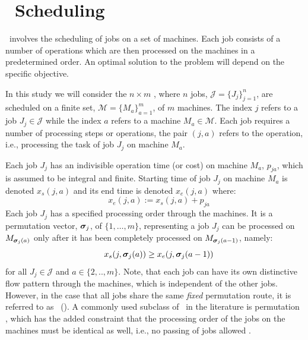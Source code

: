 \documentclass[twocolumn]{svjour3}
\begin{document}

\section{\Jsp~Scheduling}\label{sec:problemdef}
\JSP\ involves the scheduling of jobs on a set of 
machines. Each job consists of a number of operations which are then processed 
on the machines in a predetermined order. An optimal solution to the problem 
will depend on the specific objective. 

In this study we will consider the $n\times m$ \JSP, where $n$ jobs, 
$\mathcal{J}=\{J_j\}_{j=1}^n$, are scheduled on a finite set, 
$\mathcal{M}=\{M_a\}_{a=1}^m$, of $m$ machines. The index $j$ refers to a job 
$J_j\in\mathcal{J}$ while the index  $a$ refers to a machine 
$M_a\in\mathcal{M}$. 
Each job requires a number of processing steps or operations, the pair 
$(j,a)$ refers to the operation, i.e., processing the task of job $J_j$ on 
machine $M_a$. 

Each job $J_j$ has an indivisible operation time (or cost) on machine $M_a$, 
$p_{ja}$, which is assumed to be integral and finite. 
Starting time of job $J_j$ on machine $M_a$ is denoted $x_s(j,a)$ and its 
end time is denoted $x_e(j,a)$ where:
\begin{equation}\quad x_e(j,a):=x_s(j,a)+p_{ja} \end{equation} 
Each job $J_j$ has a specified processing order through the machines. It is a 
permutation vector, $\bm \sigma_j$, of $\{1,\ldots,m\}$, representing a job $J_j$ 
can 
be processed on $M_{\bm \sigma_j(a)}$ only after it has been completely processed 
on $M_{\bm \sigma_j(a-1)}$, namely:
\begin{equation}\quad\label{eq:permutation}
x_s(j,\bm \sigma_j(a)) \geq x_e(j,\bm \sigma_j(a-1)) 
\end{equation}
for all $J_j\in\mathcal{J}$ and $a\in\{2,..,m\}$. 
Note, that each job can have its own distinctive flow pattern through the 
machines, which is independent of the other jobs. 
However, in the case that all jobs share the same \emph{fixed} permutation 
route, it is referred to as \fsp~(\FSP). 
A commonly used subclass of \FSP\ in the literature is permutation \fsp, which 
has the added constraint that the processing order of the jobs on the machines 
must be identical as well, i.e., no passing of jobs allowed \cite{Stafford88}.
\end{document}
